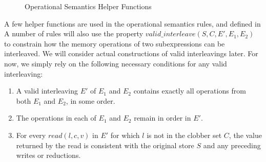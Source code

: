 \begin{itemize}
\begin{figure*}
\caption{Operational Semantics Helper Functions}
\label{fig:opsemfns}
\end{figure*}

A few helper functions are used in the operational semantics rules, and defined in 
A number of rules will also use the property $valid\_interleave(S, C, E', E_1, E_2)$ to 
constrain how the memory operations of two subexpressions can be interleaved.  We will 
consider actual constructions of valid interleavings later.  For now, we simply rely on
the following necessary conditions for any valid interleaving:
\begin{enumerate}
\item A valid interleaving $E'$ of $E_1$ and $E_2$ contains exactly all operations from both
$E_1$ and $E_2$, in some order.
\item The operations in each of $E_1$ and $E_2$ remain in order in $E'$.
\item For every $read(l, c, v)$ in $E'$ for which $l$ is not in the clobber set $C$, the value 
returned by the read is consistent with the original store $S$ and any preceding writes or
reductions.
\end{enumerate}
\end{itemize}




